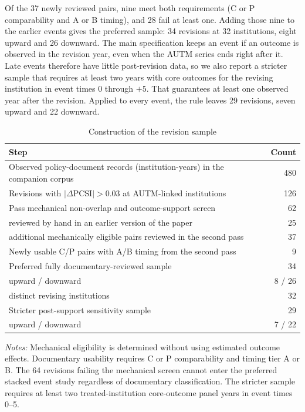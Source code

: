 Of the 37 newly reviewed pairs, nine meet both requirements (C or P comparability and A or B timing), and 28 fail at least one. Adding those nine to the earlier events gives the preferred sample: 34 revisions at 32 institutions, eight upward and 26 downward. The main specification keeps an event if an outcome is observed in the revision year, even when the AUTM series ends right after it. Late events therefore have little post-revision data, so we also report a stricter sample that requires at least two years with core outcomes for the revising institution in event times 0 through $+5$. That guarantees at least one observed year after the revision. Applied to every event, the rule leaves 29 revisions, seven upward and 22 downward.

\begin{table}[htbp]\centering
\caption{Construction of the revision sample}\label{tab:revsample}
\begin{threeparttable}\small
\begin{tabular}{p{11.3cm}r}\toprule
Step & Count \\\midrule
Observed policy-document records (institution-years) in the companion corpus & 480 \\
Revisions with $|\Delta\mathrm{PCSI}|>0.03$ at AUTM-linked institutions & 126 \\
Pass mechanical non-overlap and outcome-support screen & 62 \\
\quad reviewed by hand in an earlier version of the paper & 25 \\
\quad additional mechanically eligible pairs reviewed in the second pass & 37 \\
Newly usable C/P pairs with A/B timing from the second pass & 9 \\
Preferred fully documentary-reviewed sample & 34 \\
\quad upward / downward & 8 / 26 \\
\quad distinct revising institutions & 32 \\
Stricter post-support sensitivity sample & 29 \\
\quad upward / downward & 7 / 22 \\
\bottomrule
\end{tabular}
\begin{tablenotes}[flushleft]\footnotesize
\item \textit{Notes:} Mechanical eligibility is determined without using estimated outcome effects. Documentary usability requires C or P comparability and timing tier A or B. The 64 revisions failing the mechanical screen cannot enter the preferred stacked event study regardless of documentary classification. The stricter sample requires at least two treated-institution core-outcome panel years in event times 0--5.
\end{tablenotes}
\end{threeparttable}
\end{table}

